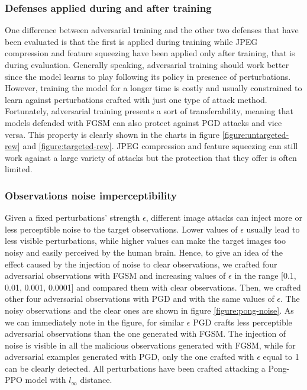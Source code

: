 \subsubsection{Defenses applied during and after training}
One difference between adversarial training and the other two defenses that have been evaluated is that the first is applied during training while JPEG compression and feature squeezing have been applied only after training, that is during evaluation. Generally speaking, adversarial training should work better since the model learns to play following its policy in presence of perturbations. However, training the model for a longer time is costly and usually constrained to learn against perturbations crafted with just one type of attack method. Fortunately, adversarial training presents a sort of transferability, meaning that models defended with FGSM can also protect against PGD attacks and vice versa. This property is clearly shown in the charts in figure \ref{figure:untargeted-rew} and \ref{figure:targeted-rew}. JPEG compression and feature squeezing can still work against a large variety of attacks but the protection that they offer is often limited.

\subsubsection{Observations noise imperceptibility}
Given a fixed perturbations' strength \(\epsilon\), different image attacks can inject more or less perceptible noise to the target observations. Lower values of \(\epsilon\) usually lead to less visible perturbations, while higher values can make the target images too noisy and easily perceived by the human brain. Hence, to give an idea of the effect caused by the injection of noise to clear observations, we crafted four adversarial observations with FGSM and increasing values of \(\epsilon\) in the range [0.1, 0.01, 0.001, 0.0001] and compared them with clear observations. Then, we crafted other four adversarial observations with PGD and with the same values of \(\epsilon\). The noisy observations and the clear ones are shown in figure \ref{figure:pong-noise}. As we can immediately note in the figure, for similar \(\epsilon\) PGD crafts less perceptible adversarial observations than the one generated with FGSM. The injection of noise is visible in all the malicious observations generated with FGSM, while for adversarial examples generated with PGD, only the one crafted with \(\epsilon\) equal to 1 can be clearly detected. All perturbations have been crafted attacking a Pong-PPO model with \(l_\infty\) distance.

